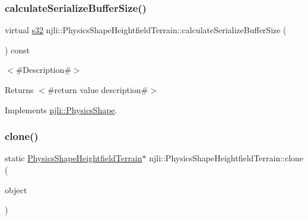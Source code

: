 \mbox{\label{classnjli_1_1_physics_shape_heightfield_terrain_a67209a4c37b16ff0de98ac273296f2b0}} 
\subsubsection{\texorpdfstring{calculate\+Serialize\+Buffer\+Size()}{calculateSerializeBufferSize()}}
{\footnotesize\ttfamily virtual \mbox{\hyperlink{_util_8h_aa62c75d314a0d1f37f79c4b73b2292e2}{s32}} njli\+::\+Physics\+Shape\+Heightfield\+Terrain\+::calculate\+Serialize\+Buffer\+Size (\begin{DoxyParamCaption}{ }\end{DoxyParamCaption}) const\hspace{0.3cm}{\ttfamily [virtual]}}

$<$\#\+Description\#$>$

\begin{DoxyReturn}{Returns}
$<$\#return value description\#$>$ 
\end{DoxyReturn}


Implements \mbox{\hyperlink{classnjli_1_1_physics_shape_a0612a1c8c3f4520d78cb7f5838f03074}{njli\+::\+Physics\+Shape}}.

\mbox{\label{classnjli_1_1_physics_shape_heightfield_terrain_a965bf005222bec5d75310ffed11d621a}} 
\subsubsection{\texorpdfstring{clone()}{clone()}}
{\footnotesize\ttfamily static \mbox{\hyperlink{classnjli_1_1_physics_shape_heightfield_terrain}{Physics\+Shape\+Heightfield\+Terrain}}$\ast$ njli\+::\+Physics\+Shape\+Heightfield\+Terrain\+::clone (\begin{DoxyParamCaption}\item[{const \mbox{\hyperlink{classnjli_1_1_physics_shape_heightfield_terrain}{Physics\+Shape\+Heightfield\+Terrain}} \&}]{object }\end{DoxyParamCaption})\hspace{0.3cm}{\ttfamily [static]}}


